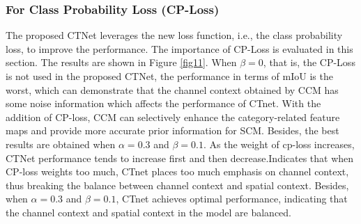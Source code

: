 \documentclass[10pt,journal,cspaper,compsoc]{IEEEtran}
\begin{document}
	
\subsubsection{For Class Probability Loss (CP-Loss)}
The proposed CTNet leverages the new loss function, i.e., the class probability loss, to improve the performance. The importance of CP-Loss is evaluated in this section. The results are shown in Figure \ref{fig11}. When $\beta=0$, that is, the CP-Loss is not used in the proposed CTNet, the performance in terms of mIoU is the worst, which can demonstrate that the channel context obtained by CCM has some noise information which affects the performance of CTnet. With the addition of CP-loss, CCM can selectively enhance the category-related feature maps and provide more accurate prior information for SCM. Besides, the best results are obtained when $\alpha=0.3$ and $\beta=0.1$. As the weight of cp-loss increases, CTNet performance tends to increase first and then decrease.Indicates that when CP-loss weights too much, CTnet places too much emphasis on channel context, thus breaking the balance between channel context and spatial context. Besides, when $\alpha=0.3$ and $\beta=0.1$, CTnet achieves optimal performance, indicating that the channel context and spatial context in the model are balanced.
\end{document}
